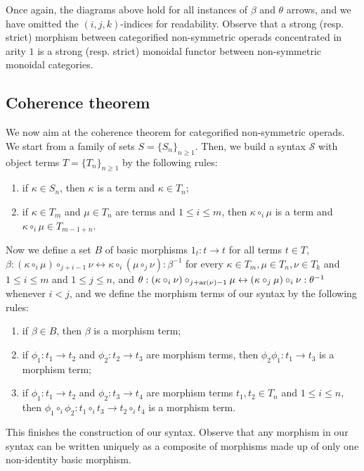 Once again, the diagrams above hold for all instances of $\beta$ and $\theta$ arrows, and we have omitted the $(i,j,k)$-indices for readability. 
Observe that a strong (resp. strict) morphism between categorified non-symmetric operads concentrated in arity $1$ is a strong (resp. strict) monoidal functor between non-symmetric monoidal categories. 

\subsection{Coherence theorem}

We now aim at the coherence theorem for categorified non-symmetric operads.
We start from a family of sets $S=\{S_n\}_{n \geq 1}$.
Then, we build a syntax $\mathcal{S}$ with object terms $T=\{T_n\}_{n\geq 1}$ by the following rules:
\begin{enumerate}
    \item if $\kappa \in S_n$, then $\kappa$ is a term and $\kappa \in T_n$;
    \item if $\kappa \in T_m$ and $\mu \in T_n$ are terms and $1 \leq i \leq m$, then $\kappa \circ_i \mu$ is a term and $\kappa \circ_i \mu \in T_{m-1+n}$.
\end{enumerate}
Now we define a set $B$ of basic morphisms $1_t : t \to t$ for all terms $t\in T$, $\beta: (\kappa \circ_i \mu) \circ_{j+i-1} \nu \leftrightarrow \kappa \circ_i (\mu \circ_j \nu) : \beta^{-1}$ for every $\kappa \in T_m, \mu \in T_n, \nu \in T_k$ and $1 \leq i \leq m$ and $1 \leq j \leq n$, and $\theta: (\kappa \circ_i \nu) \circ_{j+\mathrm{ar}(\nu)-1} \mu \leftrightarrow (\kappa \circ_j \mu) \circ_i \nu : \theta^{-1}$ whenever $i<j$, and we define the morphism terms of our syntax by the following rules:
\begin{enumerate}
    \item if $\beta \in B$, then $\beta$ is a morphism term; 
    \item if $\phi_1: t_1 \to t_2$ and $\phi_2: t_2 \to t_3$ are morphism terms, then $\phi_2 \phi_1 : t_1 \to t_3$ is a morphism term;
    \item if $\phi_1 : t_1 \to t_2$ and $\phi_2 : t_3 \to t_4$ are morphism terms $t_1,t_2 \in T_n$ and $1 \leq i \leq n$, then $\phi_1 \circ_i \phi_2 : t_1 \circ_i t_3 \to t_2 \circ_i t_4$ is a morphism term. 
\end{enumerate}
This finishes the construction of our syntax. 
Observe that any morphism in our syntax can be written uniquely as a composite of morphisms made up of only one non-identity basic morphism. 

